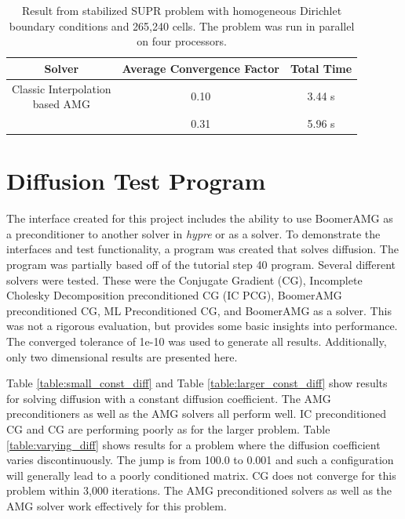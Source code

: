 \documentclass[11pt]{article}
\begin{document}
\begin{table}[!h]
	\begin{center}
		\label{tab:supg_air_classical_comparison}
		\caption{Result from stabilized SUPR problem with homogeneous Dirichlet boundary conditions and 265,240 cells. The problem was run in parallel on four processors.}
		\begin{tabular}{|c|c|c|}
			\hline
			Solver & Average Convergence Factor & Total Time \\ \hline
			\makecell{Classic Interpolation\\based AMG}&0.10&3.44 s \\ \hline
			\makecell{AIR AMG}&0.31&5.96 s \\ \hline
		\end{tabular}
	\end{center}
\end{table}

\section{Diffusion Test Program}
The interface created for this project includes the ability to use BoomerAMG as a preconditioner to another solver in \textit{hypre} or as a solver. To demonstrate the interfaces and test functionality, a program was created that solves diffusion. The program was partially based off of the tutorial step 40 program. Several different solvers were tested. These were the Conjugate Gradient (CG), Incomplete Cholesky Decomposition preconditioned CG (IC PCG), BoomerAMG preconditioned CG, ML Preconditioned CG, and BoomerAMG as a solver. This was not a rigorous evaluation, but provides some basic insights into performance. The converged tolerance of 1e-10 was used to generate all results. Additionally, only two dimensional results are presented here.

Table \ref{table:small_const_diff} and Table \ref{table:larger_const_diff} show results for solving diffusion with a constant diffusion coefficient. The AMG preconditioners as well as the AMG solvers all perform well. IC preconditioned CG and CG are performing poorly as for the larger problem. Table \ref{table:varying_diff} shows results for a problem where the diffusion coefficient varies discontinuously. The jump is from 100.0 to 0.001 and such a configuration will generally lead to a poorly conditioned matrix. CG does not converge for this problem within 3,000 iterations. The AMG preconditioned solvers as well as the AMG solver work effectively for this problem.  
\end{document}
